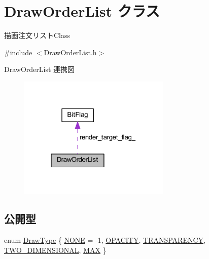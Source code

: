 \hypertarget{class_draw_order_list}{}\section{Draw\+Order\+List クラス}
\label{class_draw_order_list}


描画注文リスト\+Class  




{\ttfamily \#include $<$Draw\+Order\+List.\+h$>$}



Draw\+Order\+List 連携図\nopagebreak
\begin{figure}[H]
\begin{center}
\leavevmode
\includegraphics[width=205pt]{class_draw_order_list__coll__graph}
\end{center}
\end{figure}
\subsection*{公開型}
\begin{DoxyCompactItemize}
\item 
enum \mbox{\hyperlink{class_draw_order_list_a6c9b9ceb312c16d399ef355f4f3486bb}{Draw\+Type}} \{ \newline
\mbox{\hyperlink{class_draw_order_list_a6c9b9ceb312c16d399ef355f4f3486bbab2a83851af51b7cbf059ef9522ab908f}{N\+O\+NE}} = -\/1, 
\mbox{\hyperlink{class_draw_order_list_a6c9b9ceb312c16d399ef355f4f3486bba4c769c665704d5a6d9a3fa1fa34966fb}{O\+P\+A\+C\+I\+TY}}, 
\mbox{\hyperlink{class_draw_order_list_a6c9b9ceb312c16d399ef355f4f3486bba38e4ff40be41d3ca753da42d6a628173}{T\+R\+A\+N\+S\+P\+A\+R\+E\+N\+CY}}, 
\mbox{\hyperlink{class_draw_order_list_a6c9b9ceb312c16d399ef355f4f3486bba3e5454163533de348e3b3a819e75eb6c}{T\+W\+O\+\_\+\+D\+I\+M\+E\+N\+S\+I\+O\+N\+AL}}, 
\newline
\mbox{\hyperlink{class_draw_order_list_a6c9b9ceb312c16d399ef355f4f3486bba6af2a2923ac1094762cf45ca43fc12ab}{M\+AX}}
 \}
\end{DoxyCompactItemize}
